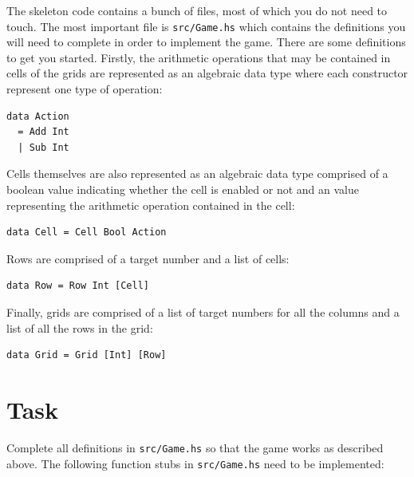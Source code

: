 The skeleton code contains a bunch of files, most of which you do not need to touch. The most important file is \texttt{\small src/Game.hs} which contains the definitions you will need to complete in order to implement the game. There are some definitions to get you started. Firstly, the arithmetic operations that may be contained in cells of the grids are represented as an algebraic data type where each constructor represent one type of operation:
\begin{verbatim}
data Action 
  = Add Int 
  | Sub Int 
\end{verbatim}
Cells themselves are also represented as an algebraic data type comprised of a boolean value indicating whether the cell is enabled or not and an  value representing the arithmetic operation contained in the cell:
\begin{verbatim}
data Cell = Cell Bool Action
\end{verbatim}
Rows are comprised of a target number and a list of cells:
\begin{verbatim}
data Row = Row Int [Cell]
\end{verbatim}
Finally, grids are comprised of a list of target numbers for all the columns and a list of all the rows in the grid:
\begin{verbatim}
data Grid = Grid [Int] [Row]
\end{verbatim}






\section{Task}

Complete all definitions in \texttt{\small src/Game.hs} so that the game works as described above. The following function stubs in \texttt{\small src/Game.hs}  need to be implemented:

